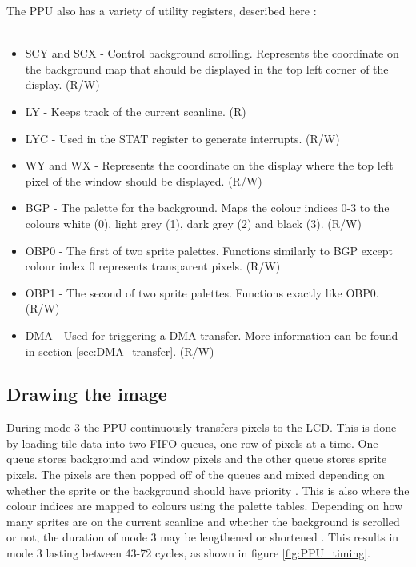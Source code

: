 \vspace{30pt}

The PPU also has a variety of utility registers, described here \cite{pandocsVideo}:\\
\\
\begin{itemize}
    \item SCY and SCX - Control background scrolling. Represents the coordinate on the background map that should be displayed in the top left corner of the display. (R/W)
    \item LY - Keeps track of the current scanline. (R)
    \item LYC - Used in the STAT register to generate interrupts. (R/W)
    \item WY and WX - Represents the coordinate on the display where the top left pixel of the window should be displayed. (R/W)
    \item BGP - The palette for the background. Maps the colour indices 0-3 to the colours white (0), light grey (1), dark grey (2) and black (3). (R/W)
    \item OBP0 - The first of two sprite palettes. Functions similarly to BGP except colour index 0 represents transparent pixels. (R/W)
    \item OBP1 - The second of two sprite palettes. Functions exactly like OBP0. (R/W)
    \item DMA - Used for triggering a DMA transfer. More information can be found in section \ref{sec:DMA_transfer}.  (R/W)
\end{itemize}

\subsection{Drawing the image}
\label{sec:PPU_Drawing}
During mode 3 the PPU continuously transfers pixels to the LCD. This is done by loading tile data into two FIFO queues, one row of pixels at a time. One queue stores background  and window pixels and the other queue stores sprite pixels. The pixels are then popped off of the queues and mixed depending on whether the sprite or the background should have priority \cite{pandocsDrawing}. This is also where the colour indices are mapped to colours using the palette tables. Depending on how many sprites are on the current scanline and whether the background is scrolled or not, the duration of mode 3 may be lengthened or shortened \cite{pandocsDrawing}. This results in mode 3 lasting between 43-72 cycles, as shown in figure \ref{fig:PPU_timing}.

